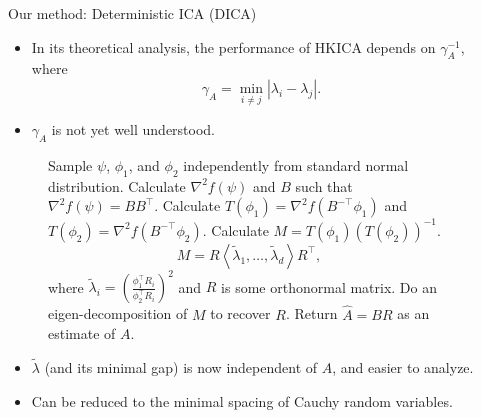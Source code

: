 \documentclass[final]{beamer} %
\begin{document}
\begin{frame}[c]
\begin{columns}[t,totalwidth=\textwidth]
	\begin{column}{0.01\textwidth}
	\end{column}
	\begin{column}{0.32\textwidth}
			
		\begin{block}{Our method: Deterministic ICA (DICA)}	
			\begin{itemize}
				\item In its theoretical analysis,  the performance of HKICA depends on $\gamma_A^{-1}$, where
					\[
					\gamma_A = \min_{i\neq j} \left\vert \lambda_i - \lambda_j\right \vert.
					\]
					\vspace{-0.98cm}
				\item $\gamma_A$ is not yet well understood.
			\end{itemize}	
			\begin{figure}
			\begin{algorithmic}[1]
				\STATE Sample $\psi$, $\phi_1$, and $\phi_2$ independently from standard normal distribution.\vspace{0.1ex}
				\STATE Calculate $\nabla^2 f(\psi)$ and $B$ such that $\nabla^2 f(\psi) = BB^{\top}$.\vspace{0.1ex}
				\STATE Calculate $T(\phi_1) = \nabla^2 f(B^{-\top}\phi_1)$ and $T(\phi_2) = \nabla^2 f(B^{-\top}\phi_2)$.\vspace{0.1ex}
				\STATE Calculate $M = T(\phi_1)(T(\phi_2))^{-1}$.
					\[
					M = R \left\langle\tilde{\lambda}_1, \ldots, \tilde{\lambda}_d \right\rangle R^{\top},
					\]
					where $\tilde{\lambda}_i = \left(\frac{\phi_1^{\top}R_i}{\phi_2^{\top}R_i}\right)^2$ and $R$ is some orthonormal matrix.\vspace{0.1ex}
				\STATE Do an eigen-decomposition of $M$ to recover $R$.\vspace{0.1ex}
				\STATE Return $\hat{A} = BR$ as an estimate of $A$. \vspace{0.1ex}
			\end{algorithmic}
			\end{figure}
			\begin{itemize}
				\item $\tilde{\lambda}$ (and its minimal gap) is now independent of $A$, and easier to analyze.
				\item Can be reduced to the minimal spacing of Cauchy random variables.
			\end{itemize}
			\bigskip
		\end{block}

\end{column}
\end{columns}
\end{frame}
\end{document}

